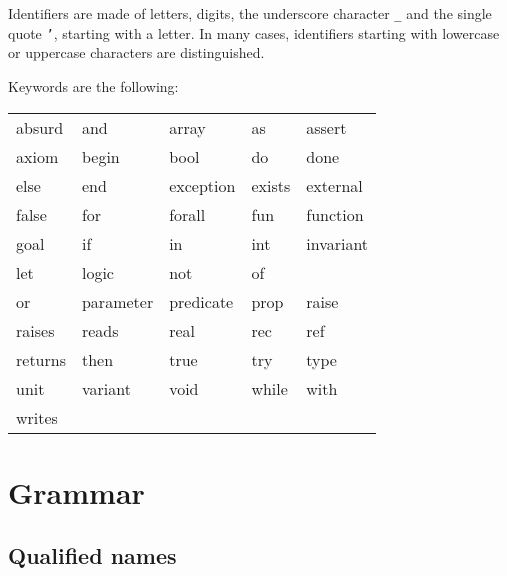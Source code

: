\documentclass[a4paper,12pt]{report}
\begin{document}
Identifiers are made of letters, digits,
the underscore character \texttt{\_} and the single quote \texttt{'},
starting with a letter. In many cases, identifiers starting with
lowercase or uppercase characters are distinguished.

\begin{center}\end{center}

Keywords are the following:
\begin{center}
{\tt\begin{tabular}{l@{\qquad}l@{\qquad}l@{\qquad}l@{\qquad}l}
        absurd &
	and &
        array &
	as &
	assert \\
	axiom &
	begin &
        bool &
	do &
	done \\
        else &
	end &
	exception &
	exists &
	external \\
        false &
	for &
	forall &
	fun &
	function \\
	goal &
	if &
	in &
	int &
	invariant \\
	let &
	logic &
	not &
	of \\
	or &
	parameter &
	predicate &
	prop &
	raise \\
	raises &
	reads &
	real &
	rec &
	ref \\
	returns &
	then &
	true &
	try &
	type \\
	unit &
	variant &
	void &
	while &
	with \\
        writes &
\end{tabular}}
\end{center}

\section{Grammar}

\subsection{Qualified names}
\end{document}
